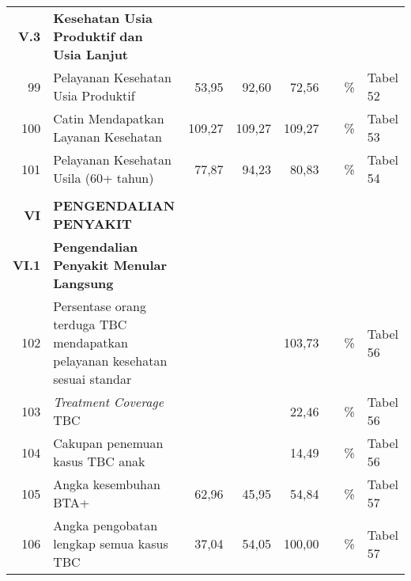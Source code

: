 \begin{small}
\begin{longtable}{rY{12em}rrrrY{5em}Y{5em}}
	\textbf{V.3} & \textbf{Kesehatan Usia Produktif dan Usia Lanjut}                  &        &        &                    &          &                                &          \\
	 99 & Pelayanan Kesehatan Usia Produktif                                          &  53,95 &  92,60 &              72,56 &          & \%                             & Tabel 52 \\
	100 & Catin Mendapatkan Layanan Kesehatan                                         & 109,27 & 109,27 &             109,27 &          & \%                             & Tabel 53 \\
	101 & Pelayanan Kesehatan Usila (60+ tahun)                                       &  77,87 &  94,23 &              80,83 &          & \%                             & Tabel 54 \\
	&                                                                                 &        &        &                    &          &                                &          \\
	\textbf{VI} & \textbf{PENGENDALIAN PENYAKIT}                                      &        &        &                    &          &                                &          \\
	\textbf{VI.1} & \textbf{Pengendalian Penyakit Menular Langsung}                   &        &        &                    &          &                                &          \\
	102 & Persentase orang terduga TBC mendapatkan pelayanan kesehatan sesuai standar &        &        &             103,73 &          & \%                             & Tabel 56 \\
	103 & \emph{Treatment Coverage} TBC                                               &        &        &              22,46 &          & \%                             & Tabel 56 \\
	104 & Cakupan penemuan kasus TBC anak                                             &        &        &              14,49 &          & \%                             & Tabel 56 \\
	105 & Angka kesembuhan BTA+                                                       &  62,96 &  45,95 &              54,84 &          & \%                             & Tabel 57 \\
	106 & Angka pengobatan lengkap semua kasus TBC                                    &  37,04 &  54,05 &             100,00 &          & \%                             & Tabel 57 \\

\end{longtable}
\end{small}
